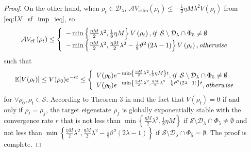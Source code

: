 \documentclass[]{elsarticle}
\begin{document}
\begin{proof}
	On the other hand, when $\rho_{t}\in \mathcal{D}_\lambda$, $\mathcal{A} V_{\mathrm{csfm}}\left(\rho_{t}\right)\le-\frac{1}{2}{\eta M}\lambda^2V\left(\rho_{t}\right)$ from \eqref{eq:LV_sf_imp_ieq}, so
	\begin{equation*}
		\begin{aligned}
			\mathcal{A}V_{\mathrm{cf}}\left(\rho_{t}\right)\le
			\left\{ \begin{array}{l}-\min\left\{\frac{{\eta M}}{2}\lambda^{2}, \frac{1}{8}\eta M\right\}V\left(\rho_{t}\right), 	\text{\textit{if}}~\mathcal{S}\setminus \mathcal{D}_\lambda\cap\Phi_5\neq\emptyset\\ -\min\left\{\frac{{\eta M}}{2}\lambda^{2}, \frac{{\eta M}}{2}\lambda^{2}-\frac{1}{8}\vartheta^2\left(2\lambda-1\right)\right\}V\left(\rho_{t}\right), \text{\textit{otherwise}}\end{array} \right. 
		\end{aligned}
	\end{equation*}
	such that 
	\begin{equation*}
		\begin{aligned}
			\mathbb{E}[V(\rho_t)]\leq V(\rho_0) e^{-r t} 
			\leq\left\{ \begin{array}{l}V(\rho_0) e^{-\min\left\{\frac{{\eta M}}{2}\lambda^{2}, \frac{1}{8}\eta M\right\}t}, \text{\textit{if}}~\mathcal{S}\setminus \mathcal{D}_\lambda\cap\Phi_5\neq\emptyset\\ V(\rho_0) e^{-\min\left\{\frac{{\eta M}}{2}\lambda^{2}, \frac{{\eta M}}{2}\lambda^{2}-\frac{1}{8}\vartheta^2\left(2\lambda-1\right)\right\}t}, \text{\textit{otherwise}}\end{array} \right. 
		\end{aligned}
	\end{equation*}
	for $\forall \rho_{0},\rho_{t}\in \mathcal{S}$. According to Theorem 3 in \cite{CSRJ2020} and the fact that $V\left(\rho_t\right)= 0$ if and only if $\rho_{t}=\rho_{f}$, the target eigenstate $\rho_f$ is globally exponentially stable with the convergence rate $r$ that is not less than $\min\left\{\frac{{\eta M}}{2}\lambda^{2}, \frac{1}{8}\eta M\right\}$ if $\mathcal{S}\setminus \mathcal{D}_\lambda\cap\Phi_5\neq\emptyset$ and not less than $\min\left\{\frac{{\eta M}}{2}\lambda^{2}, \frac{{\eta M}}{2}\lambda^{2}-\frac{1}{8}\vartheta^2\left(2\lambda-1\right)\right\}$ if $\mathcal{S}\setminus \mathcal{D}_\lambda\cap\Phi_5=\emptyset$. The proof is complete.
\end{proof}
\end{document}
